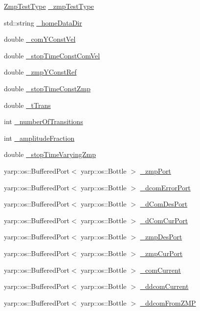 \begin{DoxyCompactItemize}
\hyperlink{WalkingClient_8h_afc01479a47f5a87462a54b6a9e11fffa}{Zmp\+Test\+Type} \hyperlink{classWalkingClient_a14576258d7fed1b36919145f1b56d74c}{\+\_\+zmp\+Test\+Type}
\item 
std\+::string \hyperlink{classWalkingClient_ade3bf018661152fc0404d3973ea30783}{\+\_\+home\+Data\+Dir}
\item 
double \hyperlink{classWalkingClient_a4e448bc147b41d97e0f17af6ebb0020f}{\+\_\+com\+Y\+Const\+Vel}
\item 
double \hyperlink{classWalkingClient_a9f19b1a1184cbdbf883cc374c6b6b88f}{\+\_\+stop\+Time\+Const\+Com\+Vel}
\item 
double \hyperlink{classWalkingClient_a6cba3194816a0be78a8b17d539806115}{\+\_\+zmp\+Y\+Const\+Ref}
\item 
double \hyperlink{classWalkingClient_a58b08317f6d8b825a21e1db8c7f0ff32}{\+\_\+stop\+Time\+Const\+Zmp}
\item 
double \hyperlink{classWalkingClient_a144518766ec4eb9eeab230fcb291e20c}{\+\_\+t\+Trans}
\item 
int \hyperlink{classWalkingClient_aefb4ed994a32879a526f2bc8c962927f}{\+\_\+number\+Of\+Transitions}
\item 
int \hyperlink{classWalkingClient_ac548ce03ea9ceffb4b42981942f66dd0}{\+\_\+amplitude\+Fraction}
\item 
double \hyperlink{classWalkingClient_a2ed3837afa0c366f1cdef16b2a99b761}{\+\_\+stop\+Time\+Varying\+Zmp}
\item 
yarp\+::os\+::\+Buffered\+Port$<$ yarp\+::os\+::\+Bottle $>$ \hyperlink{classWalkingClient_af2e0817fa94ca802775addd22b09bf7a}{\+\_\+zmp\+Port}
\item 
yarp\+::os\+::\+Buffered\+Port$<$ yarp\+::os\+::\+Bottle $>$ \hyperlink{classWalkingClient_a1b01264c9d9d403a68a149d86d1bc53f}{\+\_\+dcom\+Error\+Port}
\item 
yarp\+::os\+::\+Buffered\+Port$<$ yarp\+::os\+::\+Bottle $>$ \hyperlink{classWalkingClient_a17369473b4fe2ff0eaecc7d41a8430c7}{\+\_\+d\+Com\+Des\+Port}
\item 
yarp\+::os\+::\+Buffered\+Port$<$ yarp\+::os\+::\+Bottle $>$ \hyperlink{classWalkingClient_a1fbc9d7f1e967f24acda745028f865df}{\+\_\+d\+Com\+Cur\+Port}
\item 
yarp\+::os\+::\+Buffered\+Port$<$ yarp\+::os\+::\+Bottle $>$ \hyperlink{classWalkingClient_acbac3e142471448b50dd605e4217b0d0}{\+\_\+zmp\+Des\+Port}
\item 
yarp\+::os\+::\+Buffered\+Port$<$ yarp\+::os\+::\+Bottle $>$ \hyperlink{classWalkingClient_a546e6830e43d19ba7d8a8e808e28ef53}{\+\_\+zmp\+Cur\+Port}
\item 
yarp\+::os\+::\+Buffered\+Port$<$ yarp\+::os\+::\+Bottle $>$ \hyperlink{classWalkingClient_a199a104e0d4d52deae07d88d8229b60d}{\+\_\+com\+Current}
\item 
yarp\+::os\+::\+Buffered\+Port$<$ yarp\+::os\+::\+Bottle $>$ \hyperlink{classWalkingClient_a692d95b3e76a396d107b0c29a3d591f1}{\+\_\+ddcom\+Current}
\item 
yarp\+::os\+::\+Buffered\+Port$<$ yarp\+::os\+::\+Bottle $>$ \hyperlink{classWalkingClient_a41b7320607812418af496b8b2c30204f}{\+\_\+ddcom\+From\+Z\+MP}
\end{DoxyCompactItemize}


